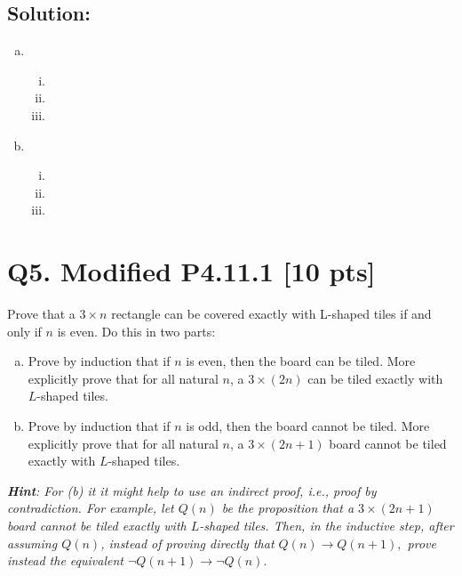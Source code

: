 \documentclass[12pt]{article}
\begin{document}
\subsection*{\textbf{Solution:}}
\begin{enumerate}[(a)]
    \item \ 
        \begin{enumerate}[(i)]
            \item 
            \item 
            \item 
        \end{enumerate}
    \item \ 
        \begin{enumerate}[(i)]
            \item 
            \item 
            \item 
        \end{enumerate}
\end{enumerate}


\newpage

\section*{\textbf{Q5. Modified P4.11.1} [10 pts]}
Prove  that a $3 \times n$ rectangle can be covered exactly with L-shaped tiles if and only if $n$ is even.  Do this in two parts:

\begin{enumerate}[(a)]
    \item Prove by induction that  if $n$ is even,  then the  board can be tiled.  More explicitly prove that for all natural $n$, a $3 \times (2n)$ can be tiled exactly with $L$-shaped tiles.
    \item Prove by induction that  if $n$ is odd,  then the  board cannot be tiled.  More explicitly prove that for all natural $n$, a $3 \times (2n+1)$ board cannot be tiled exactly with $L$-shaped tiles.
\end{enumerate}


{\em \textbf{Hint}: For (b) it it might help to use an indirect proof, i.e., proof by contradiction. For example, let  $Q(n)$ be the proposition that  a $3 \times (2n+1)$ board cannot be tiled exactly with $L$-shaped tiles. Then, in the inductive step, after assuming $Q(n)$, instead of proving directly that $Q(n) \rightarrow Q(n+1),$ prove instead the equivalent  $\neg Q(n+1)\rightarrow \neg Q(n).$ 
}
\end{document}
